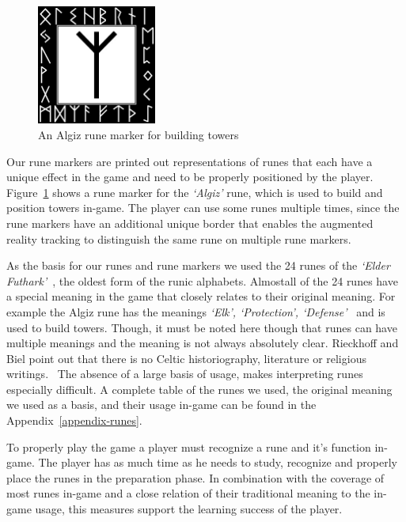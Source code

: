 \begin{figure}
	\centering
	\includegraphics[width=0.35\textwidth]{figures/algiz0.jpeg}
	\caption{\label{fig:rune-marker} An Algiz rune marker for building towers}
\end{figure}

Our rune markers are printed out representations of runes that each have a unique effect in the game and need to be properly positioned by the player. Figure~\ref{fig:rune-marker} shows a rune marker for the \textit{`Algiz'} rune, which is used to build and position towers in-game.
The player can use some runes multiple times, since the rune markers have an additional unique border that enables the augmented reality tracking to distinguish the same rune on multiple rune markers.

As the basis for our runes and rune markers we used the 24 runes of the \textit{`Elder Futhark'}~\cite{elder-futhark}, the oldest form of the runic alphabets.
Almost\footnotemark all of the 24 runes have a special meaning in the game that closely relates to their original meaning.
For example the Algiz rune has the meanings \textit{`Elk', `Protection', `Defense'}~\cite{algiz} and is used to build towers.
Though, it must be noted here though that runes can have multiple meanings and the meaning is not always absolutely clear.
Rieckhoff and Biel point out that there is no Celtic historiography, literature or religious writings.~\cite{rieckhoff-runes} The absence of a large basis of usage, makes interpreting runes especially difficult.
A complete table of the runes we used, the original meaning we used as a basis, and their usage in-game can be found in the Appendix~\ref{appendix-runes}.

To properly play the game a player must recognize a rune and it's function in-game.
The player has as much time as he needs to study, recognize and properly place the runes in the preparation phase.\footnotemark
In combination with the coverage of most runes in-game and a close relation of their traditional meaning to the in-game usage, this measures support the learning success of the player.

